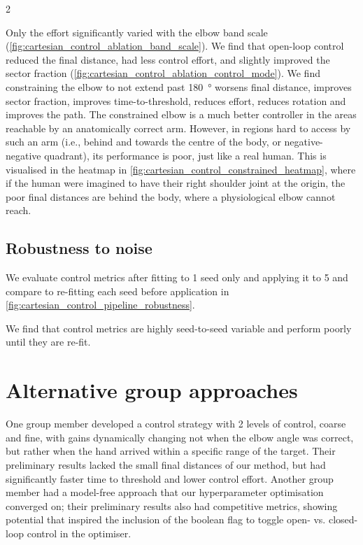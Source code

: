 \documentclass[a4paper, 10pt]{article}
\begin{document}
\begin{multicols*}{2}

  Only the effort significantly varied with the elbow band scale
  (\autoref{fig:cartesian_control_ablation_band_scale}). We find that open-loop
  control reduced the final distance, had less control effort, and slightly
  improved the sector fraction
  (\autoref{fig:cartesian_control_ablation_control_mode}). We find constraining
  the elbow to not extend past \SI{180}{\degree} worsens final distance,
  improves sector fraction, improves time-to-threshold, reduces effort, reduces
  rotation and improves the path. The constrained elbow is a much better
  controller in the areas reachable by an anatomically correct arm.
  However, in regions hard to access by such an arm (i.e., behind and towards
  the centre of the body, or negative-negative quadrant), its performance is
  poor, just like a real human. This is visualised in the heatmap in
  \autoref{fig:cartesian_control_constrained_heatmap}, where if the human were
  imagined to have their right shoulder joint at the origin, the poor final
  distances are behind the body, where a physiological elbow cannot reach.


  \subsection*{Robustness to noise}

  We evaluate control metrics after fitting to 1 seed only and applying it to 5
  and compare to re-fitting each seed before application in
  \autoref{fig:cartesian_control_pipeline_robustness}.



  We find that control metrics are highly seed-to-seed variable and perform
  poorly until they are re-fit.

  \section*{Alternative group approaches}

  One group member developed a control strategy with 2 levels of control,
  coarse and fine, with gains dynamically changing not when the elbow angle was
  correct, but rather when the hand arrived within a specific range of the target.
  Their preliminary results lacked the small final distances of our method, but
  had significantly faster time to threshold and lower control effort. Another
  group member had a model-free approach that our hyperparameter optimisation
  converged on; their preliminary results also had competitive metrics,
  showing potential that inspired the inclusion of the boolean flag to toggle
  open- vs. closed-loop control in the optimiser.


\end{multicols*}
\end{document}
